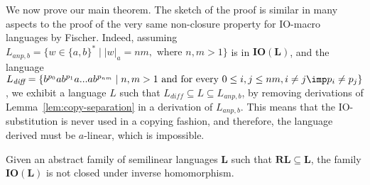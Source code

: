 We now prove our main theorem. The sketch of the proof is similar in many aspects to the proof of the very same non-closure property for IO-macro languages by Fischer.
Indeed, assuming $L_{anp,b} = \{w \in \{a, b\}^\ast \mid |w|_a=nm, \text{ where }n,m > 1\}$ is in $\mathbf{IO(L)}$, and the language $L_{\textit{diff}} = \{b^{p_0}ab^{p_1}a...ab^{p_{nm}} \mid n,m > 1 \text{ and for every }  0 \leq i,j \leq nm, i \neq j \imp p_i \neq p_j\}$, we exhibit a language $L$ such that $L_{\textit{diff}} \subseteq L \subseteq L_{anp,b}$, by removing derivations of Lemma~\ref{lem:copy-separation} in a derivation of $L_{anp,b}$. This means that the IO-substitution is never used in a copying fashion, and therefore, the language derived must be $a$-linear, which is impossible.

\begin{theorem}
Given an abstract family of semilinear languages $\mathbf{L}$ such that $\mathbf{RL} \subseteq \mathbf{L}$, the family $\mathbf{IO(L)}$ is not closed under inverse homomorphism.
\end{theorem}
